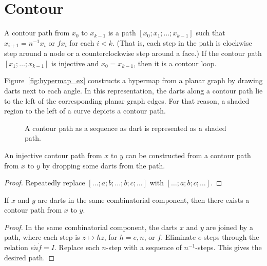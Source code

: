 \section{Contour}


\begin{definition}  A contour path from $x_0$ to $x_{k-1}$ is a path  $[x_0;x_1;\ldots;x_{k-1}]$ such that $x_{i+1} = n^{-1} x_i$ or $f x_i$ for each $i<k$.  (That is, each step in the path is clockwise step around a node or a counterclockwise step around a face.)   If the contour path $[x_1;\ldots;x_{k-1}]$ is injective and  $x_0 = x_{k-1}$, then it is a contour loop.
\end{definition}

\begin{remark}  Figure~\ref{fig:hypermap_ex} constructs a hypermap from a planar graph by drawing darts next to each angle.  In this representation, the darts along a contour path lie to the left of the corresponding planar graph edges.  For that reason, a shaded region to the left of a curve depicts a contour path.
\end{remark}

\begin{figure}[htb]
  \centering
  \caption{A contour path as a sequence as dart is represented as a shaded path.}
  \label{fig:shade-dart}
\end{figure}

\begin{lemma} An injective contour path from $x$ to $y$ can be constructed from a contour path from $x$ to $y$ by dropping some darts from the path.
\end{lemma}

\begin{proof} Repeatedly replace $[\ldots;a;b;\ldots;b;c;\ldots]$ with
$[\ldots;a;b;c;\ldots]$.
\end{proof}





\begin{lemma}  
If $x$ and $y$ are darts in the same combinatorial component, then there exists a contour path from $x$ to $y$.
\end{lemma}

\begin{proof} 
In the same combinatorial component, the darts $x$ and $y$ are joined by a path, where each step is $z\mapsto h z$, for $h=e,n$, or $f$.  Eliminate $e$-steps through the relation $e\ocirc n\ocirc f = I$.   Replace each $n$-step with a sequence of $n^{-1}$-steps.  This gives the desired path.
\end{proof}

